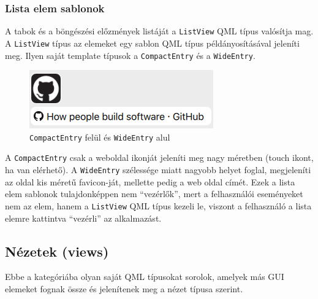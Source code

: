 \documentclass[12pt]{report}
\begin{document}
\subsubsection{Lista elem sablonok}
\label{sec:list-entry-templates}
A tabok és a böngészési előzmények listáját a \texttt{ListView} QML típus valósítja mag.
A \texttt{ListView} típus az elemeket egy sablon QML típus példányosításával
jeleníti meg. Ilyen saját template típusok a \texttt{CompactEntry} és a \texttt{WideEntry}.
\begin{figure}[H]
    \centering
    \includegraphics[scale=0.8]{Compact-Wide-Entries}
    \caption{
        \label{fig:compact-wide-entries}
        \texttt{CompactEntry} felül és \texttt{WideEntry} alul
    }
\end{figure}
A \texttt{CompactEntry} csak a weboldal ikonját jeleníti meg nagy méretben (touch ikont, ha
van elérhető). A \texttt{WideEntry} szélessége miatt nagyobb helyet foglal, megjeleníti az
oldal kis méretű favicon-ját, mellette pedig a web oldal címét. Ezek a lista elem sablonok
tulajdonképpen nem ``vezérlők'', mert a felhasználói eseményeket nem az elem, hanem a
\texttt{ListView} QML típus kezeli le, viszont a felhasználó a lista elemre kattintva
``vezérli'' az alkalmazást.

\subsection{Nézetek (views)}
Ebbe a kategóriába olyan saját QML típusokat sorolok, amelyek más GUI elemeket fognak össze
és jelenítenek meg a nézet típusa szerint.
\end{document}
